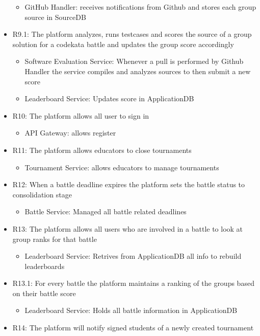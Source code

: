\begin{itemize}
\begin{itemize}
\item GitHub Handler: receives notifications from Github and stores each group source in SourceDB
\end{itemize}
\item R9.1: The platform analyzes, runs testcases and scores the source of a group solution for a codekata battle and updates the group score accordingly
\begin{itemize}
\item Software Evaluation Service: Whenever a pull is performed by Github Handler the service compiles and analyzes sources to then submit a new score
\item Leaderboard Service: Updates score in ApplicationDB
\end{itemize}
\item R10: The platform allows all user to sign in
\begin{itemize}
\item API Gateway: allows register
\end{itemize}
\item R11: The platform allows educators to close tournaments
\begin{itemize}
\item Tournament Service: allows educators to manage tournaments
\end{itemize}
\item R12: When a battle deadline expires the platform sets the battle status to consolidation stage
\begin{itemize}
\item Battle Service: Managed all battle related deadlines
\end{itemize}
\item R13: The platform allows all users who are involved in a battle to look at group ranks for that battle
\begin{itemize}
\item Leaderboard Service: Retrives from ApplicationDB all info to rebuild leaderboards
\end{itemize}
\item R13.1: For every battle the platform maintains a ranking of the groups based on their battle score
\begin{itemize}
\item Leaderboard Service: Holds all battle information in ApplicationDB
\end{itemize}
\item R14: The platform will notify signed students of a newly created tournament

\end{itemize}
